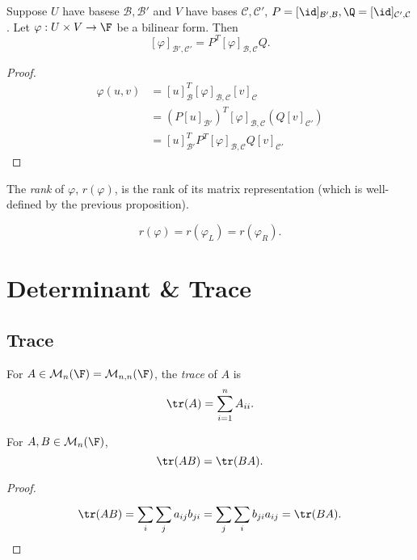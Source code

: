\documentclass[a4paper]{article}
\newcommand*{\basis}{\mathcal}
\newcommand*{\M}{\mathcal{M}}
\theoremstyle{definition}
\begin{document}
\begin{proposition}
  Suppose \(U\) have basese \(\basis B, \basis B'\) and \(V \) have bases \(\basis C, \basis C'\), \(P = [\id]_{\basis B', \basis B}, \Q = [\id]_{\basis C',\basis C}\). Let \(\varphi: U \times V \to \F\) be a bilinear form. Then
  \[
    [\varphi]_{\basis B',\basis C'} = P^T[\varphi]_{\basis B,\basis C}Q.
  \]
\end{proposition}

\begin{proof}
  \begin{align*}
    \varphi(u, v) &= [u]_{\basis B}^T [\varphi]_{\basis B, \basis C} [v]_{\basis C} \\
                  &= (P[u]_{\basis B'})^T [\varphi]_{\basis B, \basis C} (Q[v]_{\basis C'}) \\
                  &= [u]_{\basis B'}^T P^T[\varphi]_{\basis B, \basis C}Q[v]_{\basis C'} 
  \end{align*}
\end{proof}

\begin{definition}
  The \emph{rank} of \(\varphi\), \(r(\varphi)\), is the rank of its matrix representation (which is well-defined by the previous proposition).
\end{definition}

\begin{note}
  \[
    r(\varphi) = r(\varphi_L) = r(\varphi_R).
  \]
\end{note}

\section{Determinant \& Trace}

\subsection{Trace}

\begin{definition}[Trace]
  For \(A \in \M_n(\F) = \M_{n,n}(\F)\), the \emph{trace} of \(A\) is
  \[
    \tr(A) = \sum_{i=1}^{n}A_{ii}.
  \]
\end{definition}

\begin{lemma}
  For \(A, B\in \M_n(\F)\),
  \[
    \tr(AB) = \tr(BA).
  \]
\end{lemma}

\begin{proof}
  \[
    \tr(AB) = \sum_{i}^{ }\sum_{j}^{ }a_{ij}b_{ji} = \sum_{j}^{ }\sum_{i}^{ }b_{ji}a_{ij} = \tr(BA).
  \]
\end{proof}
\end{document}
